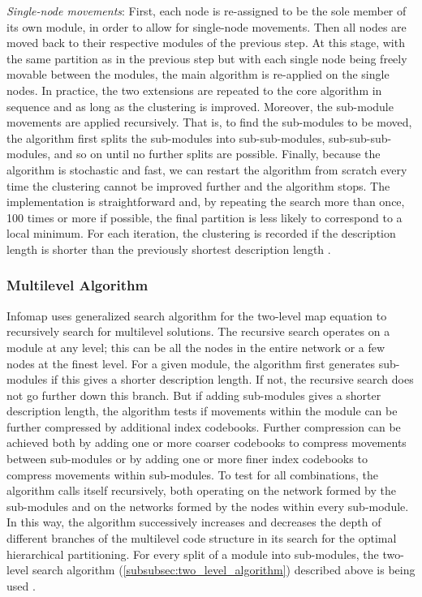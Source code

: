 \textit{Single-node movements}: First, each node is re-assigned to be the sole member of its own module, in order to allow for single-node movements. Then all nodes are moved back to their respective modules of the previous step. At this stage, with the same partition as in the previous step but with each single node being freely movable between the modules, the main algorithm is re-applied on the single nodes.
In practice, the two extensions are repeated to the core algorithm in sequence and as long as the clustering is improved. Moreover, the sub-module movements are applied recursively. That is, to find the sub-modules to be moved, the algorithm first splits the sub-modules into sub-sub-modules, sub-sub-sub-modules, and so on until no further splits are possible. Finally, because the algorithm is stochastic and fast, we can restart the algorithm from scratch every time the clustering cannot be improved further and the algorithm stops. The implementation is straightforward and, by repeating the search more than once, 100 times or more if possible, the final partition is less likely to correspond to a local minimum. For each iteration, the clustering is recorded if the description length is shorter than the previously shortest description length \cite{ref-47}.

\subsubsection*{Multilevel Algorithm}\label{subsubsec:multilevel_algorithm}
Infomap uses generalized search algorithm for the two-level map equation to recursively search for multilevel solutions. The recursive search operates on a module at any level; this can be all the nodes in the entire network or a few nodes at the finest level. For a given module, the algorithm first generates sub-modules if this gives a shorter description length. If not, the recursive search does not go further down this branch. But if adding sub-modules gives a shorter description length, the algorithm tests if movements within the module can be further compressed by additional index codebooks. Further compression can be achieved both by adding one or more coarser codebooks to compress movements between sub-modules or by adding one or more finer index codebooks to compress movements within sub-modules. To test for all combinations, the algorithm calls itself recursively, both operating on the network formed by the sub-modules and on the networks formed by the nodes within every sub-module. In this way, the algorithm successively increases and decreases the depth of different branches of the multilevel code structure in its search for the optimal hierarchical partitioning. For every split of a module into sub-modules, the two-level search algorithm (\ref{subsubsec:two_level_algorithm}) described above is being used \cite{ref-47}.

